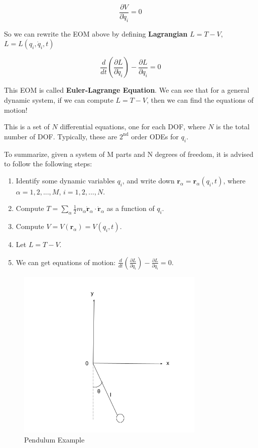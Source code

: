 \[
    \frac{\partial V}{\partial \dot{q}_i}=0
\]

So we can rewrite the EOM above by defining \textbf{Lagrangian} $L=T-V$, $L=L(q_i, \dot{q}_i, t)$

\[
    \frac{d}{dt} (\frac{\partial L}{\partial \dot{q}_i}) - \frac{\partial L}{\partial q_i} = 0
\]

This EOM is called \textbf{Euler-Lagrange Equation}. We can see that for a general dynamic system, if we can compute $L=T-V$, then we can find the equations of motion!

This is a set of $N$ differential equations, one for each DOF, where $N$ is the total number of DOF. Typically, these are $2^{\text{nd}}$ order ODEs for $q_i$.

To summarize, given a system of M parts and N degrees of freedom, it is advised to follow the following steps:

\begin{enumerate}
    \item Identify some dynamic variables $q_i$, and write down $\mathbf{r}_\alpha=\mathbf{r}_\alpha(q_i, t)$, where $\alpha=1,2,...,M$, $i=1,2,...,N$.
    \item Compute $T=\sum_\alpha \frac{1}{2} m_\alpha \dot{\mathbf{r}}_\alpha \cdot \dot{\mathbf{r}}_\alpha$ as a function of $q_i$.
    \item Compute $V=V(\mathbf{r}_\alpha)=V(q_i, t)$.
    \item Let $L=T-V$.
    \item We can get equations of motion: $\frac{d}{dt} (\frac{\partial L}{\partial \dot{q}_i}) - \frac{\partial L}{\partial q_i} = 0$.
\end{enumerate}

\begin{figure}[h]
  \centering
  \includegraphics[width=0.8\textwidth]{images/2-1-1.png}
  \caption{Pendulum Example}
  \label{fig:2-1-1}
\end{figure}

